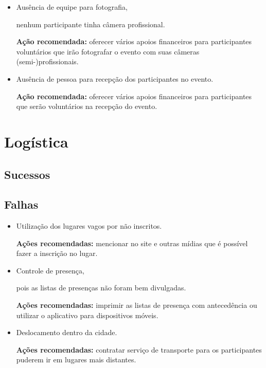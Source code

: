 \documentclass[12pt]{article}
\begin{document}
\begin{itemize}
  \item Ausência de equipe para fotografia,

    nenhum participante tinha câmera profissional.

    \textbf{Ação recomendada:} oferecer vários apoios financeiros para
    participantes voluntários que irão fotografar o evento com suas câmeras
    (semi-)profissionais.

  \item Ausência de pessoa para recepção dos participantes no evento.

    \textbf{Ação recomendada:} oferecer vários apoios financeiros para
    participantes que serão voluntários na recepção do evento.

\end{itemize}

\newpage

\section*{Logística}

\subsection*{Sucessos}


\subsection*{Falhas}

\begin{itemize}
  \item Utilização dos lugares vagos por não inscritos.

    \textbf{Ações recomendadas:} mencionar no site e outras mídias que é
    possível fazer a inscrição no lugar.

  \item Controle de presença,

    pois as listas de presenças não foram bem divulgadas.

    \textbf{Ações recomendadas:} imprimir as listas de presença com antecedência
    ou utilizar o aplicativo para dispositivos móveis.

  \item Deslocamento dentro da cidade.

    \textbf{Ações recomendadas:} contratar serviço de transporte para os
    participantes puderem ir em lugares mais distantes.

\end{itemize}
\end{document}
